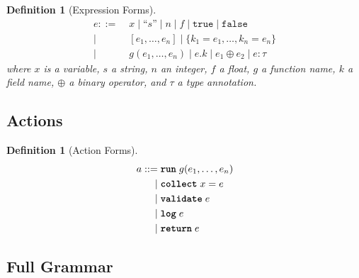 \documentclass[12pt,a4paper]{article}
\newtheorem{definition}[theorem]{Definition}
\newcommand{\kw}[1]{\textbf{\texttt{#1}}}
\begin{document}
\begin{definition}[Expression Forms]
\begin{align*}
e ::=\; & x \mid \text{``}s\text{''} \mid n \mid f \mid \texttt{true} \mid \texttt{false} \\
\mid\; & [e_1, \ldots, e_n] \mid \{k_1 = e_1, \ldots, k_n = e_n\} \\
\mid\; & g(e_1, \ldots, e_n) \mid e.k \mid e_1 \oplus e_2 \mid e : \tau
\end{align*}
where $x$ is a variable, $s$ a string, $n$ an integer, $f$ a float, $g$ a function name, $k$ a field name, $\oplus$ a binary operator, and $\tau$ a type annotation.
\end{definition}

\subsection{Actions}

\begin{definition}[Action Forms]
\begin{align*}
a ::=\; & \kw{run}\; g(e_1, \ldots, e_n) \\
\mid\; & \kw{collect}\; x = e \\
\mid\; & \kw{validate}\; e \\
\mid\; & \kw{log}\; e \\
\mid\; & \kw{return}\; e
\end{align*}
\end{definition}

\subsection{Full Grammar}
\end{document}
